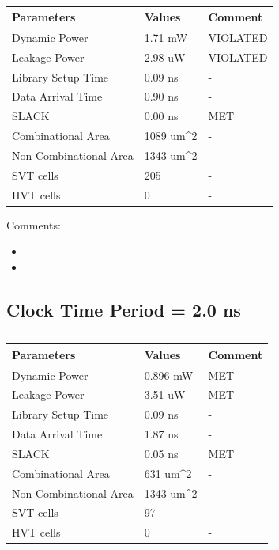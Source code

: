\documentclass[11pt,a4paper]{article}
\begin{document}
\begin{table}[htbp]
\begin{center}
\begin{tabular}{|l|l|l|}
\hline
\textbf{Parameters}	& \textbf{Values}		& \textbf{Comment}\\ \hline
Dynamic Power				&	1.71 mW				& VIOLATED\\ \hline
Leakage Power 			&	2.98 uW				& VIOLATED\\ \hline
Library Setup Time  & 0.09 ns				& - \\ \hline
Data Arrival Time		& 0.90 ns				& - \\ \hline
SLACK								& 0.00 ns				& MET\\ \hline
Combinational Area	& 1089 um^2			& - \\ \hline
Non-Combinational Area	& 1343 um^2	& - \\ \hline
SVT cells						& 205						& - \\ \hline
HVT cells						& 0							& - \\ \hline
\end{tabular}
\end{center}
\caption{}
\label{tab:syn1.0.2}
\end{table}

Comments:
\begin{itemize}
\item 
\item 
\end{itemize}

\newpage
\subsection{Clock Time Period = 2.0 ns}
\begin{table}[htbp]
\begin{center}
\begin{tabular}{|l|l|l|}
\hline
\textbf{Parameters}	& \textbf{Values}		& \textbf{Comment}\\ \hline
Dynamic Power				&	0.896 mW			& MET\\ \hline
Leakage Power 			&	3.51 uW				& MET \\ \hline
Library Setup Time  & 0.09 ns				& - \\ \hline
Data Arrival Time		& 1.87 ns				& - \\ \hline
SLACK								& 0.05 ns				& MET \\ \hline
Combinational Area	& 631 um^2			& - \\ \hline
Non-Combinational Area	& 1343 um^2	& - \\ \hline
SVT cells						& 97						& - \\ \hline
HVT cells						& 0							& - \\ \hline
\end{tabular}
\end{center}
\caption{}
\label{tab:syn2.0.1}
\end{table}
\end{document}
